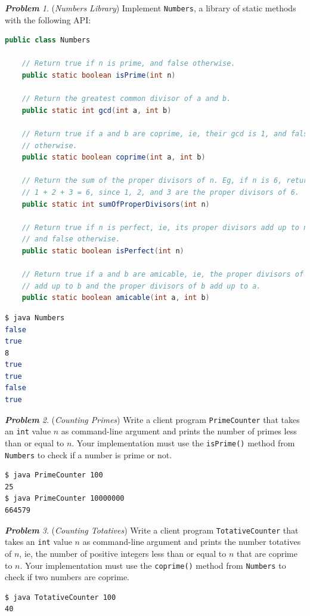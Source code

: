 \documentclass[a4paper, 12pt]{article}
\newcommand{\tit}{\textit}
\theoremstyle{remark}
\newtheorem{problem}{\normalfont \bfseries Problem}
\begin{document}
\begin{problem}
(\tit{Numbers Library}) Implement \lstinline$Numbers$, a library of static methods with the following API:

\begin{lstlisting}[language=Java]
public class Numbers

    // Return true if n is prime, and false otherwise.
    public static boolean isPrime(int n)
    
    // Return the greatest common divisor of a and b.
    public static int gcd(int a, int b)
    
    // Return true if a and b are coprime, ie, their gcd is 1, and false 
    // otherwise.
    public static boolean coprime(int a, int b)

    // Return the sum of the proper divisors of n. Eg, if n is 6, return 
    // 1 + 2 + 3 = 6, since 1, 2, and 3 are the proper divisors of 6.
    public static int sumOfProperDivisors(int n) 

    // Return true if n is perfect, ie, its proper divisors add up to n, 
    // and false otherwise.
    public static boolean isPerfect(int n) 
    
    // Return true if a and b are amicable, ie, the proper divisors of a 
    // add up to b and the proper divisors of b add up to a.
    public static boolean amicable(int a, int b) 
\end{lstlisting}

\begin{lstlisting}[language=bash]
$ java Numbers
false
true
8
true
true
false
true
\end{lstlisting}
\end{problem}

\begin{problem}
(\tit{Counting Primes}) Write a client program \lstinline$PrimeCounter$ that takes an \lstinline$int$ value $n$ as command-line argument and prints the number of primes less than or equal to $n$. Your implementation must use the \lstinline$isPrime()$ method from \lstinline$Numbers$ to check if a number is prime or not.

\begin{lstlisting}[language=bash]
$ java PrimeCounter 100
25
$ java PrimeCounter 10000000
664579
\end{lstlisting}
\end{problem}

\begin{problem}
(\tit{Counting Totatives}) Write a client program \lstinline$TotativeCounter$ that takes an \lstinline$int$ value $n$ as command-line argument and prints the number totatives of $n$, ie, the number of positive integers less than or equal to $n$ that are coprime to $n$. Your implementation must use the \lstinline$coprime()$ method from \lstinline$Numbers$ to check if two numbers are coprime.

\begin{lstlisting}[language=bash]
$ java TotativeCounter 100
40
\end{lstlisting}
\end{problem}
\end{document}
